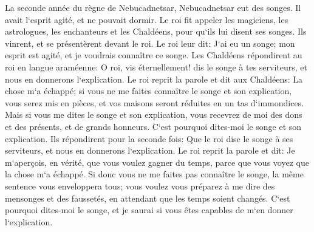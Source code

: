 \verse La seconde année du règne de Nebucadnetsar, Nebucadnetsar eut des songes. Il avait l`esprit agité, et ne pouvait dormir. 
\verse Le roi fit appeler les magiciens, les astrologues, les enchanteurs et les Chaldéens, pour qu`ils lui disent ses songes. Ils vinrent, et se présentèrent devant le roi. 
\verse Le roi leur dit: J`ai eu un songe; mon esprit est agité, et je voudrais connaître ce songe. 
\verse Les Chaldéens répondirent au roi en langue araméenne: O roi, vis éternellement! dis le songe à tes serviteurs, et nous en donnerons l`explication. 
\verse Le roi reprit la parole et dit aux Chaldéens: La chose m`a échappé; si vous ne me faites connaître le songe et son explication, vous serez mis en pièces, et vos maisons seront réduites en un tas d`immondices. 
\verse Mais si vous me dites le songe et son explication, vous recevrez de moi des dons et des présents, et de grands honneurs. C`est pourquoi dites-moi le songe et son explication. 
\verse Ils répondirent pour la seconde fois: Que le roi dise le songe à ses serviteurs, et nous en donnerons l`explication. 
\verse Le roi reprit la parole et dit: Je m`aperçois, en vérité, que vous voulez gagner du temps, parce que vous voyez que la chose m`a échappé. 
\verse Si donc vous ne me faites pas connaître le songe, la même sentence vous enveloppera tous; vous voulez vous préparez à me dire des mensonges et des faussetés, en attendant que les temps soient changés. C`est pourquoi dites-moi le songe, et je saurai si vous êtes capables de m`en donner l`explication. 
